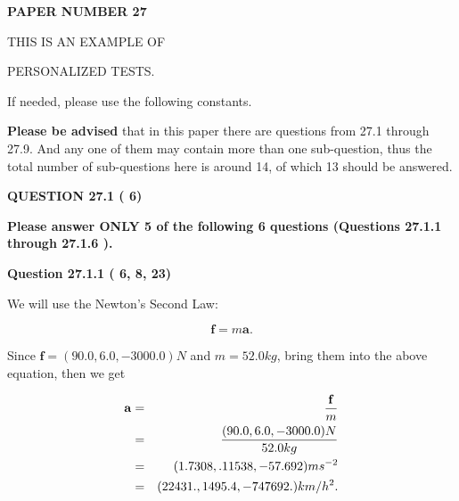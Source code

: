 \documentclass[12pt]{article}
\begin{document}
   
 {\textbf{ \Large{ PAPER NUMBER          27 }}}
   
   
\vspace{0.2in}
   
   
   
   
   
   
 \vspace{0.2in}
 
 
{\Huge  THIS IS AN EXAMPLE OF}
 
{\Huge  PERSONALIZED TESTS. }
 
If needed, please use the following constants.
 
 
 
{\textbf{\large{Please be advised}}} that in this paper there are questions from
27.1 through
27.9.
And any one of them may contain more than one sub-question, thus the total number
of sub-questions here is around 14, of which
13 should be answered.
 
\vspace{0.3in}
 
 
   
   
  
\vspace{0.2in}
  
{\textbf{\Large{QUESTION
27.1 
 (          6)
}}}
  
  
{\textbf{\Large{Please answer ONLY  %
           5 %
 of the following  %
           6 %
 questions (Questions  %
27.1.1 %
 through  %
27.1.6 %
 ). }}}
   
   
  
\vspace{0.2in}
  
{\textbf{\Large{Question
27.1.1 
 (          6,          8,         23)
}}}
  
  
 
 

We will use the Newton's Second Law:
 
\[
\mathbf{f}=m\mathbf{a}.
\]
 
Since $\mathbf{f}=( %
90.0,  %
6.0,  %
-3000.0 )N$
and $m= %
52.0kg$, bring them into the above equation, then we get
 
\begin{eqnarray*}
\mathbf{a}&=&\frac{\mathbf{f}}m  \\
&=&\frac{(
90.0 ,
6.0 ,
-3000.0 )N
}{ %
52.0 kg}  \\
&=&(
1.7308 ,
.11538,
-57.692
)ms^{-2} \\
&=&(
22431. ,
1495.4 ,
-747692.
)km/h^2.
\end{eqnarray*}
 
\end{document}
